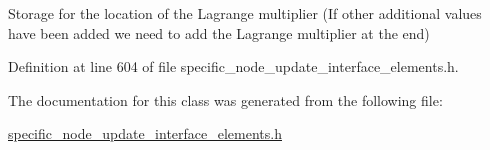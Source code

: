 Storage for the location of the Lagrange multiplier (If other additional values have been added we need to add the Lagrange multiplier at the end) 



Definition at line 604 of file specific\+\_\+node\+\_\+update\+\_\+interface\+\_\+elements.\+h.



The documentation for this class was generated from the following file\+:\begin{DoxyCompactItemize}
\item 
\hyperlink{specific__node__update__interface__elements_8h}{specific\+\_\+node\+\_\+update\+\_\+interface\+\_\+elements.\+h}\end{DoxyCompactItemize}

